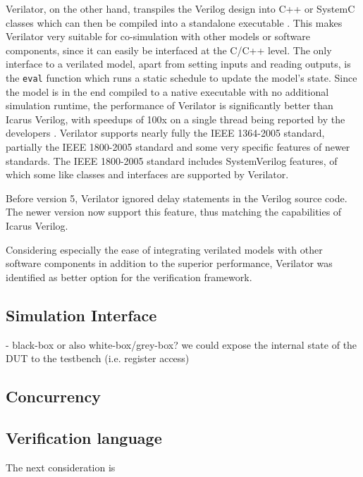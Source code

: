 \documentclass[12pt]{report}
\begin{document}
Verilator, on the other hand, transpiles the Verilog design into C++ or SystemC classes which can then be compiled
into a standalone executable \cite{verilator}. This makes Verilator very suitable for co-simulation with other models
or software components, since it can easily be interfaced at the C/C++ level. The only interface to a verilated
model, apart from setting inputs and reading outputs, is the \texttt{eval} function which runs a static schedule to
update the model's state. Since the model is in the end compiled to a native executable with no additional simulation
runtime, the performance of Verilator is significantly better than Icarus Verilog, with speedups of 100x on a single
thread being reported by the developers \cite{verilator}. Verilator supports nearly fully the IEEE 1364-2005
standard, partially the IEEE 1800-2005 standard and some very specific features of newer standards. The IEEE
1800-2005 standard includes SystemVerilog features, of which some like classes and interfaces are supported by Verilator.

Before version 5, Verilator ignored delay statements in the Verilog source code. The newer version now support this
feature, thus matching the capabilities of Icarus Verilog.

Considering especially the ease of integrating verilated models with other software components in addition to the
superior performance, Verilator was identified as better option for the verification framework.

\subsection{Simulation Interface} %

- black-box or also white-box/grey-box? we could expose the internal state of the DUT to the testbench (i.e. register access)

\subsection{Concurrency} %

\subsection{Verification language} %
The next consideration is
\end{document}
